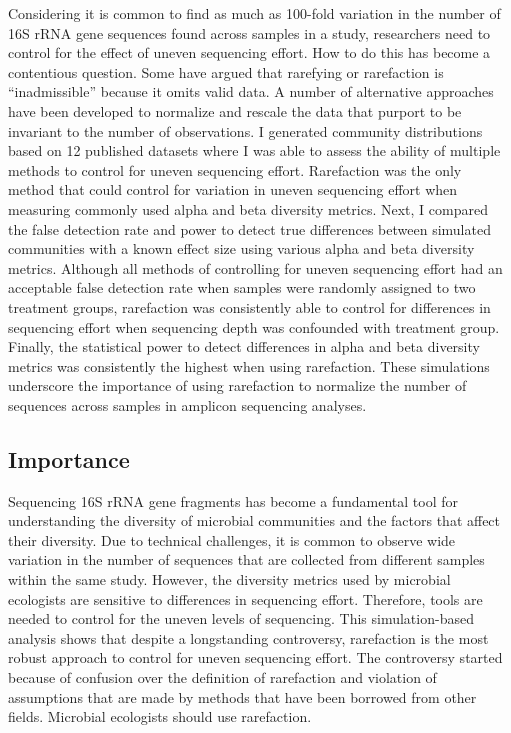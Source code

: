 \documentclass[
]{article}
\begin{document}
Considering it is common to find as much as 100-fold variation in the
number of 16S rRNA gene sequences found across samples in a study,
researchers need to control for the effect of uneven sequencing effort.
How to do this has become a contentious question. Some have argued that
rarefying or rarefaction is ``inadmissible'' because it omits valid
data. A number of alternative approaches have been developed to
normalize and rescale the data that purport to be invariant to the
number of observations. I generated community distributions based on 12
published datasets where I was able to assess the ability of multiple
methods to control for uneven sequencing effort. Rarefaction was the
only method that could control for variation in uneven sequencing effort
when measuring commonly used alpha and beta diversity metrics. Next, I
compared the false detection rate and power to detect true differences
between simulated communities with a known effect size using various
alpha and beta diversity metrics. Although all methods of controlling
for uneven sequencing effort had an acceptable false detection rate when
samples were randomly assigned to two treatment groups, rarefaction was
consistently able to control for differences in sequencing effort when
sequencing depth was confounded with treatment group. Finally, the
statistical power to detect differences in alpha and beta diversity
metrics was consistently the highest when using rarefaction. These
simulations underscore the importance of using rarefaction to normalize
the number of sequences across samples in amplicon sequencing analyses.

\hypertarget{importance}{%
\subsection{Importance}\label{importance}}

Sequencing 16S rRNA gene fragments has become a fundamental tool for
understanding the diversity of microbial communities and the factors
that affect their diversity. Due to technical challenges, it is common
to observe wide variation in the number of sequences that are collected
from different samples within the same study. However, the diversity
metrics used by microbial ecologists are sensitive to differences in
sequencing effort. Therefore, tools are needed to control for the uneven
levels of sequencing. This simulation-based analysis shows that despite
a longstanding controversy, rarefaction is the most robust approach to
control for uneven sequencing effort. The controversy started because of
confusion over the definition of rarefaction and violation of
assumptions that are made by methods that have been borrowed from other
fields. Microbial ecologists should use rarefaction.
\end{document}
